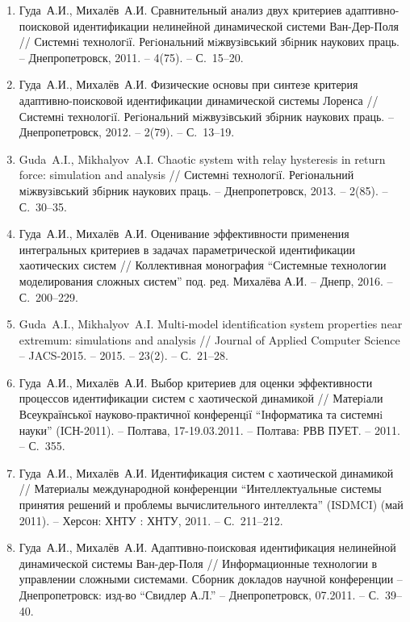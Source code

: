 \begin{enumerate}
\item
Гуда~А.И., Михалёв~А.И. Сравнительный анализ двух критериев адаптивно-поисковой
идентификации нелинейной динамической системи Ван-Дер-Поля // Системнi технологiї.
Регiональний мiжвузiвський збiрник наукових праць. -- Днепропетровск, 2011. -- 4(75). -- С.~15--20.

\item
Гуда~А.И., Михалёв~А.И. Физические основы при синтезе критерия адаптивно-поисковой идентификации
динамической системы Лоренса // Системнi технологiї.
Регiональний мiжвузiвський збiрник наукових праць. -- Днепропетровск, 2012. -- 2(79). -- С.~13--19.

\item
Guda~A.I., Mikhalyov~A.I. Chaotic system with relay hysteresis in return force: simulation
and analysis // Системнi технологiї. Регiональний мiжвузiвський збiрник наукових
праць. -- Днепропетровск, 2013. -- 2(85). -- С.~30--35.

\item
Гуда~А.И., Михалёв~А.И. Оценивание эффективности применения интегральных критериев
в задачах параметрической идентификации хаотических систем
// Коллективная монография ``Системные технологии моделирования сложных систем'' под. ред.
Михалёва А.И. -- Днепр, 2016. -- С.~200--229.

\item
Guda~A.I., Mikhalyov~A.I. Multi-model identification system properties near extremum:
simulations and analysis // Journal of Applied Computer Science – JACS-2015. -- 2015. --
23(2). -- С.~21--28.

\item
Гуда~А.И., Михалёв~А.И. Выбор критериев для оценки эффективности
процессов идентификации систем с хаотической динамикой // Матерiали Всеукраїнської науково-практичної
конференцiї ``Iнформатика та системнi науки'' (IСН-2011). – Полтава, 17-19.03.2011. – Полтава: РВВ ПУЕТ. -- 2011. -- С.~355.

\item
Гуда~А.И., Михалёв~А.И. Идентификация систем с хаотической динамикой
// Материалы международной конференции ``Интеллектуальные системы принятия решений и
проблемы вычислительного интеллекта'' (ISDMCI) (май 2011). -- Херсон: ХНТУ : ХНТУ, 2011. -- С.~211--212.

\item
Гуда~А.И., Михалёв~А.И. Адаптивно-поисковая идентификация нелинейной динамической системы Ван-дер-Поля
// Информационные технологии в управлении сложными системами. Сборник докладов научной конференции – Днепропетровск:
 изд-во ``Свидлер А.Л.'' -- Днепропетровск, 07.2011. -- С.~39--40.


\end{enumerate}
